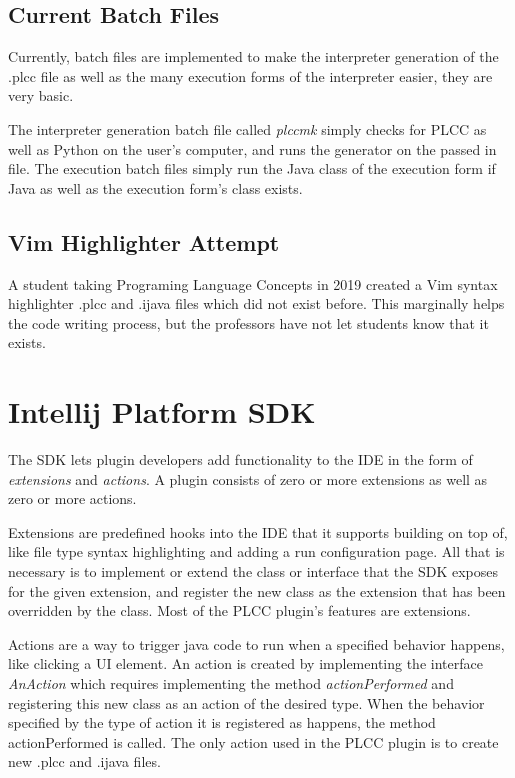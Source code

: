 \documentclass[conference, letterpaper]{IEEEtran}
\begin{document}
\subsection{Current Batch Files}\label{subsec:current-batch-files}
Currently, batch files are implemented to make the interpreter generation of the .plcc file as well as the many execution forms of the interpreter easier, they are very basic.

The interpreter generation batch file called \textit{plccmk} simply checks for PLCC as well as Python on the user's computer, and runs the generator on the passed in file.
The execution batch files simply run the Java class of the execution form if Java as well as the execution form's class exists.

\subsection{Vim Highlighter Attempt}\label{subsec:vim-highlighter-attempt}
A student taking Programing Language Concepts in 2019 created a Vim syntax highlighter .plcc and .ijava files which did not exist before.
This marginally helps the code writing process, but the professors have not let students know that it exists.


\section{Intellij Platform SDK}\label{sec:intellij-platform-sdk}
The SDK lets plugin developers add functionality to the IDE in the form of \textit{extensions} and \textit{actions}.
A plugin consists of zero or more extensions as well as zero or more actions.

Extensions are predefined hooks into the IDE that it supports building on top of, like file type syntax highlighting and adding a run configuration page.
All that is necessary is to implement or extend the class or interface that the SDK exposes for the given extension, and register the new class as the extension that has been overridden by the class.
Most of the PLCC plugin's features are extensions.

Actions are a way to trigger java code to run when a specified behavior happens, like clicking a UI element.
An action is created by implementing the interface \textit{AnAction} which requires implementing the method \textit{actionPerformed} and registering this new class as an action of the desired type.
When the behavior specified by the type of action it is registered as happens, the method actionPerformed is called.
The only action used in the PLCC plugin is to create new .plcc and .ijava files.
\end{document}
